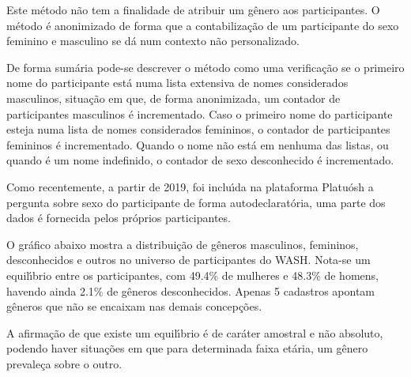 \documentclass[
12pt,		%
openright,	%
twoside,  %
a4paper,			%
chapter=TITLE,		%
english,			%
french,				%
spanish,			%
brazil				%
]{USPSC-classe/USPSC}
\begin{document}
Este m\'etodo n\~ao tem a finalidade de atribuir um g\^enero aos participantes. O m\'etodo \'e anonimizado de forma que a contabiliza\c{c}\~ao de um participante do sexo feminino e masculino se d\'a num contexto n\~ao personalizado.




De forma sum\'aria pode-se descrever o m\'etodo como uma verifica\c{c}\~ao se o primeiro nome do participante est\'a numa lista extensiva de nomes \textquotedbl considerados masculinos\textquotedbl , situa\c{c}\~ao em que, de forma anonimizada, um contador de participantes masculinos \'e incrementado. Caso o primeiro nome do participante esteja numa lista de nomes \textquotedbl considerados femininos\textquotedbl , o contador de participantes femininos \'e incrementado. Quando o nome n\~ao est\'a em nenhuma das listas, ou quando \'e um nome indefinido, o contador de \textquotedbl sexo desconhecido \'e incrementado\textquotedbl .




Como recentemente, a partir de 2019, foi inclu\'{\i}da na plataforma Platu\'osh a pergunta sobre sexo do participante de forma autodeclarat\'oria, uma parte dos dados \'e fornecida pelos pr\'oprios participantes.




O gr\'afico abaixo mostra a distribui\c{c}\~ao de g\^eneros masculinos, femininos, desconhecidos e outros no universo de participantes do WASH. Nota-se um equil\'{\i}brio entre os participantes, com 49.4\% de mulheres e 48.3\% de homens, havendo ainda 2.1\% de g\^eneros desconhecidos. Apenas 5 cadastros apontam g\^eneros que n\~ao se encaixam nas demais concep\c{c}\~oes.




A afirma\c{c}\~ao de que existe um equil\'{\i}brio \'e de car\'ater amostral e n\~ao absoluto, podendo haver situa\c{c}\~oes em que para determinada faixa et\'aria, um g\^enero prevale\c{c}a sobre o outro.
\end{document}
